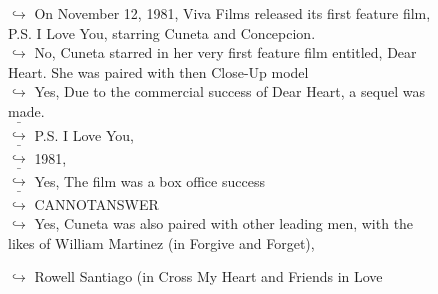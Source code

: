 \documentclass[11pt,a4paper, onecolumn]{article}
\begin{document}
\begin{figure}[t] \small \begin{tcolorbox}[boxsep=0pt,left=5pt,right=0pt,top=2pt,colback = yellow!5] \begin{dialogue}
 \small 
\colorbox{pink!25}{$\hookrightarrow$}
{ On November 12, 1981, Viva Films released its first feature film, P.S. I Love You, starring Cuneta and Concepcion. }
\\
\colorbox{pink!25}{$\hookrightarrow$}
\colorbox{red!25}{No,}
{ Cuneta starred in her very first feature film entitled, Dear Heart. She was paired with then Close-Up model }
\\
\colorbox{pink!25}{$\hookrightarrow$}
\colorbox{red!25}{Yes,}
{ Due to the commercial success of Dear Heart, a sequel was made. }
\\
\colorbox{pink!25}{ $\bar{\hookrightarrow}$}
{ P.S. I Love You, }
\\
\colorbox{pink!25}{ $\bar{\hookrightarrow}$}
{ 1981, }
\\
\colorbox{pink!25}{ $\bar{\hookrightarrow}$}
\colorbox{red!25}{Yes,}
{ The film was a box office success }
\\
\colorbox{pink!25}{ $\bar{\hookrightarrow}$}
{ CANNOTANSWER }
\\
\colorbox{pink!25}{$\hookrightarrow$}
\colorbox{red!25}{Yes,}
{ Cuneta was also paired with other leading men, with the likes of William Martinez (in Forgive and Forget), }
 \end{dialogue}\end{tcolorbox}\end{figure}\begin{figure}[t] \small \begin{tcolorbox}[boxsep=0pt,left=5pt,right=0pt,top=2pt,colback = yellow!5] \begin{dialogue}
 \small 
\colorbox{pink!25}{$\hookrightarrow$}
{ Rowell Santiago (in Cross My Heart and Friends in Love }
\\
 \end{dialogue}\end{tcolorbox}\end{figure}
\end{document}

